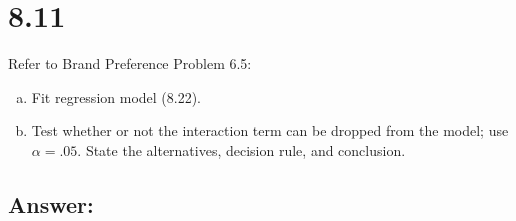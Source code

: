 \documentclass{article}
\begin{document}
\section{8.11}

Refer to Brand Preference Problem 6.5:

\begin{enumerate}[a)]
\item{} Fit regression model (8.22).
\item{} Test whether or not the interaction term can be dropped from the model; use $\alpha{} = .05$. State the alternatives, decision rule, and conclusion.
\end{enumerate}

\subsection{Answer:}
\end{document}
